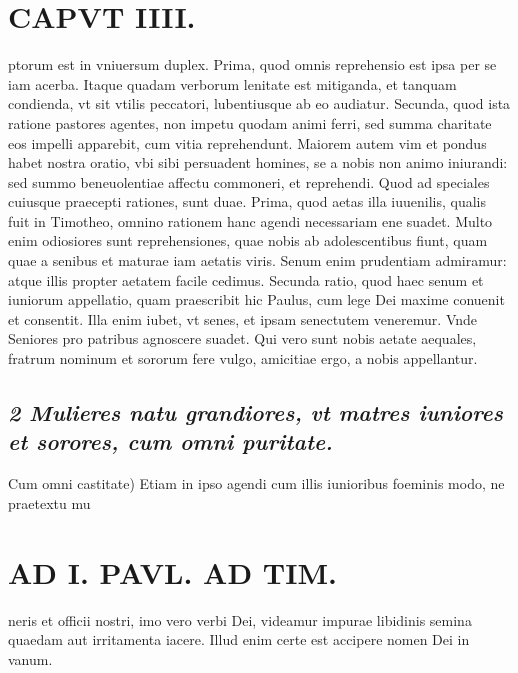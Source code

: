 \documentclass{article}
\begin{document}
\begin{pages}
\section*{CAPVT  IIII. }
\marginpar{[ p.251 ]}\pstart ptorum est in vniuersum duplex. Prima, quod omnis reprehensio est ipsa per se iam acerba. Itaque quadam verborum lenitate est mitiganda, et tanquam condienda, vt sit vtilis peccatori, lubentiusque ab eo audiatur.  \pend\pstart Secunda, quod ista ratione pastores agentes, non impetu quodam animi ferri, sed summa charitate eos impelli apparebit, cum vitia reprehendunt. Maiorem autem vim et pondus habet nostra oratio, vbi sibi persuadent homines, se a nobis non animo iniurandi: sed summo beneuolentiae affectu commoneri, et reprehendi.  \pend\pstart Quod ad speciales cuiusque praecepti rationes, sunt duae. Prima, quod aetas illa iuuenilis, qualis fuit in Timotheo, omnino rationem hanc agendi necessariam ene suadet. Multo enim odiosiores sunt reprehensiones, quae nobis ab adolescentibus fiunt, quam quae a senibus et maturae iam aetatis viris. Senum enim prudentiam admiramur: atque illis propter aetatem facile cedimus.  \pend\pstart Secunda ratio, quod haec senum et iuniorum appellatio, quam praescribit hic Paulus, cum lege Dei maxime conuenit et consentit. Illa enim iubet, vt senes, et ipsam senectutem veneremur. Vnde Seniores pro patribus agnoscere suadet. Qui vero sunt nobis aetate aequales, fratrum nominum et sororum fere vulgo, amicitiae ergo, a nobis appellantur.  \pend
{}
{}
\subsection*{\textit{2 Mulieres natu grandiores, vt matres iuniores et sorores, cum omni puritate. }}\pstart Cum omni castitate) Etiam in ipso agendi cum illis iunioribus foeminis modo, ne praetextu mu\pend
\section*{AD I. PAVL. AD TIM. }
\marginpar{[ p.252 ]}\pstart neris et officii nostri, imo vero verbi Dei, videamur impurae libidinis semina quaedam aut irritamenta iacere. Illud enim certe est accipere nomen Dei in vanum.  \pend
{}
{}

\end{pages}
\end{document}
